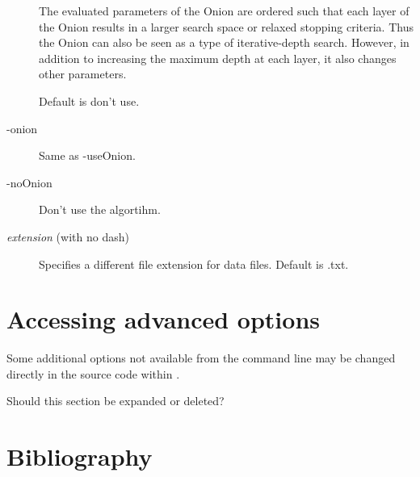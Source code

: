 \documentclass{article}
\begin{document}
\begin{description}
The evaluated parameters of the Onion are ordered such that each layer of the Onion results in a larger search space or relaxed stopping criteria.  Thus the Onion can also be seen as a type of iterative-depth search.  However, in addition to increasing the maximum depth at each layer, it also changes other parameters.

Default is don't use.

\item[-onion] Same as -useOnion.
\item[-noOnion] Don't use the \onion algortihm.
\item[\emph{extension} (with no dash)] Specifies a different file extension for data files.  Default is .txt.
\end{description}


\section{Accessing advanced options}
Some additional options not available from the command line may be changed directly in the source code within .
\begin{rfc}
Should this section be expanded or deleted?
\end{rfc}

\pagebreak
\section{Bibliography}
{


}
\pagebreak
\appendix
\end{document}
